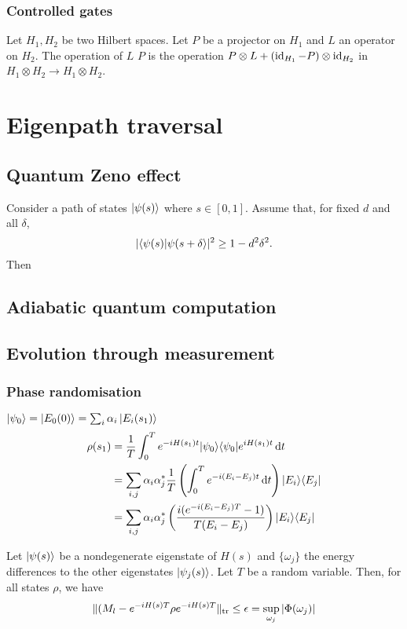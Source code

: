 \subsection{Controlled gates}
\begin{definition}
Let $H_1, H_2$ be two Hilbert spaces. Let $P$ be a projector on $H_1$ and $L$ an operator on $H_2$. The operation of $L$  $P$ is the operation $P\otimes L + (\operatorname{id}_{H_1} - P)\otimes \operatorname{id}_{H_2}$ in $H_1\otimes H_2 \to H_1\otimes H_2$. 
\end{definition}

\chapter{Eigenpath traversal}
\section{Quantum Zeno effect}
\begin{proposition}
Consider a path of states $\left| \psi(s) \right\rangle$ where $s\in[0,1]$. Assume that, for fixed $d$ and all $\delta$,
\[ |\braket{\psi(s)}{\psi(s+\delta}|^2 \geq 1-d^2\delta^2. \]
Then 
\end{proposition}

\section{Adiabatic quantum computation}
\section{Evolution through measurement}
\subsection{Phase randomisation}
$\left| \psi_0 \right\rangle = \left| E_0(0) \right\rangle = \sum_i\alpha_i\left| E_i(s_1) \right\rangle$
\begin{align*}
\rho(s_1) &= \frac{1}{T}\int_0^T e^{-iH(s_1)t}|\psi_0\rangle\langle\psi_0| e^{iH(s_1)t} \operatorname{d \!}{t} \\
&= \sum_{i,j}\alpha_i\alpha_j^* \frac{1}{T}\left(\int_0^T e^{-i(E_i-E_j)t}\operatorname{d \!}{t}\right)|E_i\rangle\langle E_j| \\
&= \sum_{i,j}\alpha_i\alpha_j^* \left(\frac{i(e^{-i(E_i-E_j)T}-1)}{T(E_i-E_j)}\right)|E_i\rangle\langle E_j|
\end{align*}

\begin{theorem}
Let $\left| \psi(s) \right\rangle$ be a nondegenerate eigenstate of $H(s)$ and $\{\omega_j\}$ the energy differences to the other eigenstates $\left| \psi_j(s) \right\rangle$. Let $T$ be a random variable. Then, for all states $\rho$, we have
\[ \lVert(M_l - e^{-iH(s)T}\rho e^{-iH(s)T}\rVert_\text{tr} \leq \epsilon = \sup_{\omega_j}|\Phi(\omega_j)| \]
\end{theorem}

